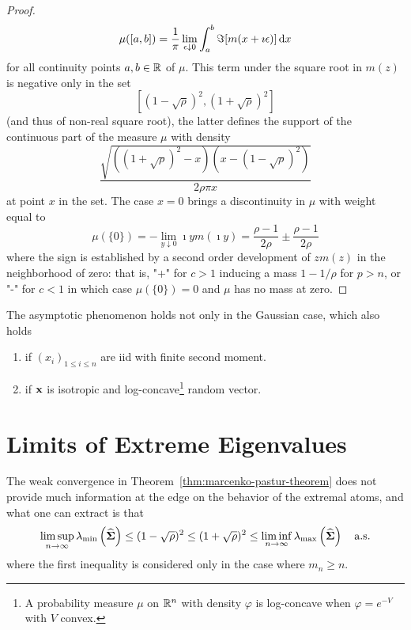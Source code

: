 \begin{proof}
	\begin{equation*}
		\mu([a,b])=\frac{1}{\pi}\lim_{\epsilon\downarrow 0}\int_{a}^{b}\Im[m(x+\imath\epsilon)]\mathop{}\!\mathrm{d} x
	\end{equation*}
	for all continuity points $a,b\in{\mathbb R}$ of $\mu$. This term under the square root in $m(z)$ is negative only in the set
	\begin{equation*}
		\left[(1-\sqrt{\rho})^{2},(1+\sqrt{\rho})^{2}\right]
	\end{equation*}
	(and thus of non-real square root), the latter defines the support of the continuous part of the measure $\mu$ with density
	\begin{equation*}
		\frac{\sqrt{\left((1+\sqrt{\rho})^{2}-x\right)\left(x-(1-\sqrt{\rho})^{2}\right)}}{2\rho\pi x}
	\end{equation*}
	at point $x$ in the set. The case $x=0$ brings a discontinuity in $\mu$ with weight equal to
	\begin{equation*}
		\mu(\{0\})=-\lim_{y\downarrow 0}\imath ym(\imath y)=\frac{\rho-1}{2\rho}\pm\frac{\rho-1}{2\rho}
	\end{equation*}
	where the sign is established by a second order development of $z m(z)$ in the neighborhood of zero: that is, "+" for $c>1$ inducing a mass $1-1/\rho$ for $p>n$, or "-" for $c<1$ in which case $\mu(\{0\})=0$ and $\mu$ has no mass at zero.
\end{proof}

\begin{remark}
	The asymptotic phenomenon holds not only in the Gaussian case, which also holds
	\begin{enumerate}
		\item if $\left(x_{i}\right)_{1\leq i\leq n}$ are iid with finite second moment.
		\item if ${\bf x}$ is isotropic and log-concave\footnote{A probability measure $\mu$ on ${\mathbb R}^{n}$ with density $\varphi$ is log-concave when $\varphi=e^{-V}$ with $V$ convex.} random vector.
	\end{enumerate}
\end{remark}

\section{Limits of Extreme Eigenvalues}

The weak convergence in Theorem~\ref{thm:marcenko-pastur-theorem} does not provide much information at the edge on the behavior of the extremal atoms, and what one can extract is that
\begin{equation}
	\limsup_{n\rightarrow\infty}\lambda_{\min}\left(\widehat{\boldsymbol{\Sigma}}\right)\leq(1-\sqrt{\rho})^{2}\leq(1+\sqrt{\rho})^{2}\leq\liminf_{n\rightarrow\infty}\lambda_{\max}\left(\widehat{\boldsymbol{\Sigma}}\right)\quad\text{a.s.}
\end{equation}
where the first inequality is considered only in the case where $m_{n}\geq n$.

